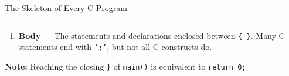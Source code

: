 \documentclass[aspectratio=169]{beamer}
\begin{document}
\begin{frame}[fragile]{The Skeleton of Every C Program}
\begin{columns}[T]
\begin{column}{0.56\textwidth}
\begin{enumerate}
					\begin{itemize}\footnotesize
						\item \texttt{int} --- the function returns an
						integer value to the host environment.
						
						\item \texttt{void} --- the function takes no
						arguments.
					\end{itemize}
					
					\item \textbf{Body} ---
					The statements and declarations enclosed between
					\texttt{\{ \}}. Many C statements end with
					\texttt{`;'}, but not all C constructs do.
					
					
				\end{enumerate}
				
				
				\footnotesize
				\textbf{Note:} Reaching the closing \texttt{\}} of
				\texttt{main()} is equivalent to \texttt{return 0;}.
				
			\end{column}
			
		\end{columns}
		
	\end{frame}
	
\end{document}
